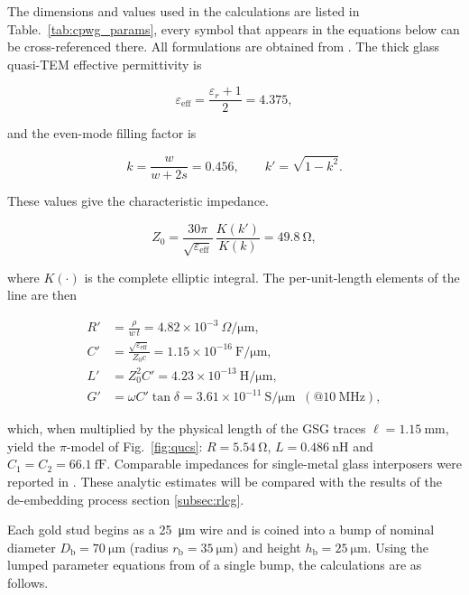 \documentclass[conference]{IEEEtran}
\begin{document}
The dimensions and values used in the calculations are listed in Table.~\ref{tab:cpwg_params}, every symbol that appears in the equations below can be cross-referenced there. All formulations are obtained from \cite{Simons2004}. The thick glass quasi-TEM effective permittivity is

\begin{equation}
\varepsilon_{\text{eff}}=\frac{\varepsilon_{r}+1}{2}=4.375,
\label{eq:eps_eff}
\end{equation}

and the even-mode filling factor is

\begin{equation}
k=\frac{w}{w+2s}=0.456,\qquad
k'=\sqrt{1-k^{2}}.
\label{eq:k_factor}
\end{equation}

These values give the characteristic impedance.

\begin{equation}
Z_{0}=\frac{30\pi}{\sqrt{\varepsilon_{\text{eff}}}}\,
      \frac{K(k')}{K(k)}=\SI{49.8}{\ohm},
\label{eq:Z0}
\end{equation}

where \(K(\cdot)\) is the complete elliptic integral. The per-unit-length elements of the line are then

\begin{subequations}\label{eq:cpwg_pul}
\begin{align}
R'&=\frac{\rho}{w\,t}=4.82\times10^{-3}\ \Omega/\si{\micro\metre},\\
C'&=\frac{\sqrt{\varepsilon_{\text{eff}}}}{Z_{0}c}=1.15\times10^{-16}\ \mathrm{F}/\si{\micro\metre},\\
L'&=Z_{0}^{2}C'=4.23\times10^{-13}\ \mathrm{H}/\si{\micro\metre},\\
G'&=\omega C'\tan\delta=3.61\times10^{-11}\ \mathrm{S}/\si{\micro\metre}
     \;\;(@\SI{10}{\mega\hertz}),
\end{align}
\end{subequations}

which, when multiplied by the physical length of the GSG traces \(\ell=\SI{1.15}{\milli\metre}\), yield the $\pi$-model of Fig.~\ref{fig:qucs}: \(R=\SI{5.54}{\ohm}\), \(L=\SI{0.486}{\nano\henry}\) and \(C_{1}=C_{2}=\SI{66.1}{\femto\farad}\). Comparable impedances for single-metal glass interposers were reported in  \cite{Wang2016}. These analytic estimates will be compared with the results of the de-embedding process section \ref{subsec:rlcg}.

Each gold stud begins as a \SI{25}{\micro\metre} wire and is coined into a bump of nominal diameter \(D_{\text{b}}=\SI{70}{\micro\metre}\) (radius \(r_{\text{b}}=\SI{35}{\micro\metre}\)) and height \(h_{\text{b}}=\SI{25}{\micro\metre}\). Using the lumped parameter equations from \cite{Simons2004} of a single bump, the calculations are as follows.
\end{document}
